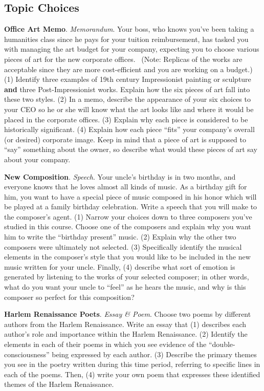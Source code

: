 \subsection*{Topic Choices}
\begin{enumerate*}
	\item \textbf{Office Art Memo}. \emph{Memorandum}. Your boss, who knows you've been taking a humanities class since he pays for your tuition reimbursement, has tasked you with managing the art budget for your company, expecting you to choose various pieces of art for the new corporate offices.  (Note: Replicas of the works are acceptable since they are more cost-efficient and you are working on a budget.)  (1) Identify three examples of 19th century Impressionist painting or sculpture \textbf{and} three Post-Impressionist works. Explain how the six pieces of art fall into these two styles. (2) In a memo, describe the appearance of your six choices to your CEO so he or she will know what the art looks like and where it would be placed in the corporate offices. (3) Explain why each piece is considered to be historically significant. (4) Explain how each piece ``fits'' your company's overall (or desired) corporate image. Keep in mind that a piece of art is supposed to ``say'' something about the owner, so describe what would these pieces of art say about your company.

	\item \textbf{New Composition}. \emph{Speech}. Your uncle's birthday is in two months, and everyone knows that he loves almost all kinds of music. As a birthday gift for him, you want to have a special piece of music composed in his honor which will be played at a family birthday celebration. Write a speech that you will make to the composer's agent. (1) Narrow your choices down to three composers you've studied in this course. Choose one of the composers and explain why you want him to write the ``birthday present'' music. (2) Explain why the other two composers were ultimately not selected. (3) Specifically identify the musical elements in the composer's style that you would like to be included in the new music written for your uncle. Finally, (4) describe what sort of emotion is generated by listening to the works of your selected composer; in other words, what do you want your uncle to ``feel'' as he hears the music, and why is this composer so perfect for this composition?

	\item \textbf{Harlem Renaissance Poets}. \emph{Essay \& Poem}. Choose two poems by different authors from the Harlem Renaissance. Write an essay that (1) describes each author's role and importance within the Harlem Renaissance. (2) Identify the elements in each of their poems in which you see evidence of the ``double-consciousness'' being expressed by each author. (3) Describe the primary themes you see in the poetry written during this time period, referring to specific lines in each of the poems. Then, (4) write your own poem that expresses these identified themes of the Harlem Renaissance.


\end{enumerate*}
